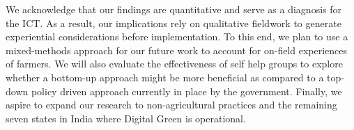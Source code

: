 \documentclass[manuscript,screen]{acmart}
\begin{document}
We acknowledge that our findings are quantitative and serve as a diagnosis for the ICT. As a result, our implications rely on qualitative fieldwork to generate experiential considerations before implementation. To this end, we plan to use a mixed-methods approach for our future work to account for on-field experiences of farmers. We will also evaluate the effectiveness of self help groups to explore whether a bottom-up approach might be more beneficial as compared to a top-down policy driven approach currently in place by the government. Finally, we aspire to expand our research to non-agricultural practices and the remaining seven states in India where Digital Green is operational.






\end{document}
